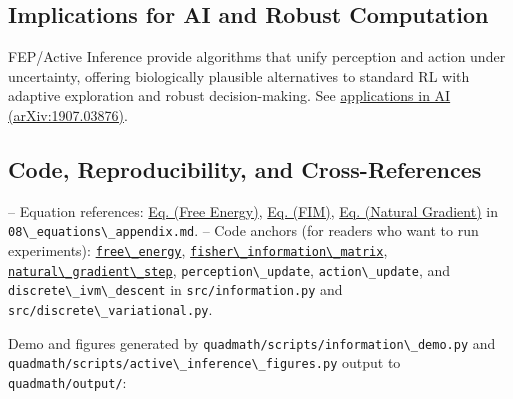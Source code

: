\documentclass[
  10pt,
]{article}
\newcommand{\passthrough}[1]{#1}
\begin{document}
\hypertarget{implications-for-ai-and-robust-computation}{%
\subsection{Implications for AI and Robust
Computation}\label{implications-for-ai-and-robust-computation}}

FEP/Active Inference provide algorithms that unify perception and action
under uncertainty, offering biologically plausible alternatives to
standard RL with adaptive exploration and robust decision-making. See
\href{https://arxiv.org/abs/1907.03876}{applications in AI
(arXiv:1907.03876)}.

\hypertarget{code-reproducibility-and-cross-references}{%
\subsection{Code, Reproducibility, and
Cross-References}\label{code-reproducibility-and-cross-references}}

-- Equation references:
\href{08_equations_appendix.md\#eq:free_energy}{Eq. (Free Energy)},
\href{08_equations_appendix.md\#eq:fim}{Eq. (FIM)},
\href{08_equations_appendix.md\#eq:natgrad}{Eq. (Natural Gradient)} in
\passthrough{\lstinline!08\_equations\_appendix.md!}. -- Code anchors
(for readers who want to run experiments):
\href{03_quadray_methods.md\#code:free_energy}{\passthrough{\lstinline!free\_energy!}},
\href{03_quadray_methods.md\#code:fisher_information_matrix}{\passthrough{\lstinline!fisher\_information\_matrix!}},
\href{03_quadray_methods.md\#code:natural_gradient_step}{\passthrough{\lstinline!natural\_gradient\_step!}},
\passthrough{\lstinline!perception\_update!},
\passthrough{\lstinline!action\_update!}, and
\passthrough{\lstinline!discrete\_ivm\_descent!} in
\passthrough{\lstinline!src/information.py!} and
\passthrough{\lstinline!src/discrete\_variational.py!}.

Demo and figures generated by
\passthrough{\lstinline!quadmath/scripts/information\_demo.py!} and
\passthrough{\lstinline!quadmath/scripts/active\_inference\_figures.py!}
output to \passthrough{\lstinline!quadmath/output/!}:
\end{document}
